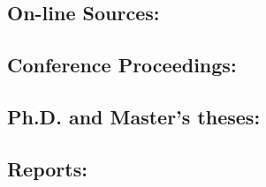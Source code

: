 \documentclass{CML_Seminar_Template}
\begin{document}
\cite[]{Gro1995}

\subsection*{On-line Sources:} 

\cite[]{Bal1994}

\subsection*{Conference Proceedings:} 

\cite[]{GrPr2003}

\subsection*{Ph.D. and Master's theses:}

\cite[]{Dou1996}

\subsection*{Reports:} 

\cite[]{BeMa1993}


%


\end{document}

